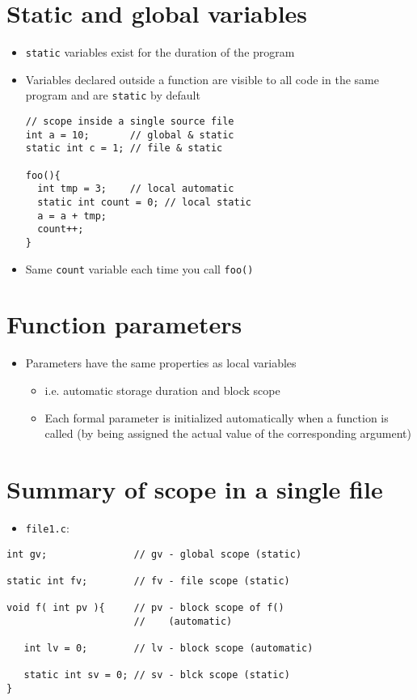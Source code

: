 \documentclass{article}
\begin{document}
\section{Static and global variables}
\begin{itemize}
\item \verb!static! variables exist for the duration of the program
\item Variables declared outside a function are visible to all code in the same program and are \verb!static! by default
\begin{verbatim}
// scope inside a single source file
int a = 10;       // global & static
static int c = 1; // file & static

foo(){
  int tmp = 3;    // local automatic
  static int count = 0; // local static
  a = a + tmp;
  count++;
}
\end{verbatim}

\item Same \verb!count! variable each time you call \verb!foo()!
\end{itemize}



\section{Function parameters}
\begin{itemize}
\item Parameters have the same properties as local variables
\begin{itemize}
\item i.e. automatic storage duration and block scope
\item Each formal parameter is initialized automatically when a function is called (by being assigned the actual value of the corresponding argument)
\end{itemize}
\end{itemize}



\section{Summary of scope in a single file}
\begin{itemize}
\item \verb!file1.c!:
\end{itemize}
\begin{verbatim}
int gv;               // gv - global scope (static)

static int fv;        // fv - file scope (static)

void f( int pv ){     // pv - block scope of f()
                      //    (automatic)

   int lv = 0;        // lv - block scope (automatic)

   static int sv = 0; // sv - blck scope (static)
}
\end{verbatim}
\end{document}
